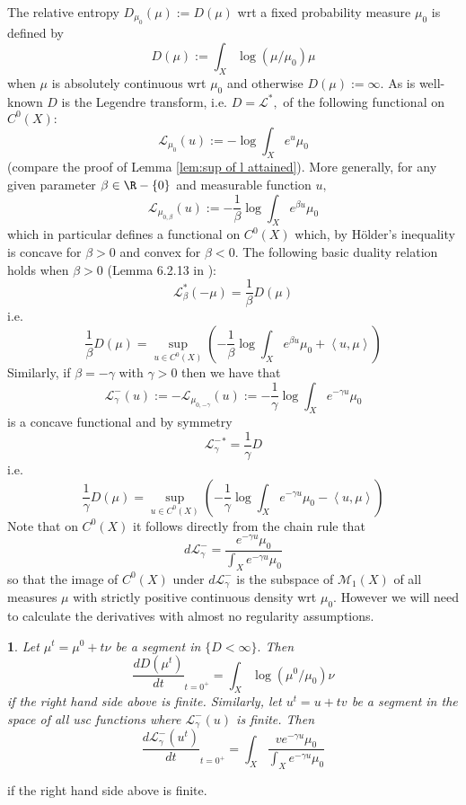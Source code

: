 \documentclass[11pt,oneside,english]{amsart}
\numberwithin{equation}{section}
\numberwithin{figure}{section}
\theoremstyle{plain}
\theoremstyle{plain}
\theoremstyle{plain}
\theoremstyle{plain}
\newtheorem{prop}[thm]{\protect\propositionname}
\theoremstyle{remark}
\theoremstyle{definition}
\providecommand{\propositionname}{Proposition}
\begin{document}
The relative entropy $D_{\mu_{0}}(\mu):=D(\mu)$ wrt a fixed probability
measure $\mu_{0}$ is defined by 
\[
D(\mu):=\int_{X}\log(\mu/\mu_{0})\mu
\]
 when $\mu$ is absolutely continuous wrt $\mu_{0}$ and otherwise
$D(\mu):=\infty.$ As is well-known $D$ is the Legendre transform,
i.e. $D=\mathcal{L}^{*},$ of the following functional on $C^{0}(X):$
\[
\mathcal{L}_{\mu_{0}}(u):=-\log\int_{X}e^{u}\mu_{0}
\]
 (compare the proof of Lemma \ref{lem:sup of l attained}). More generally,
for any given parameter $\beta\in\R-\{0\}$ and measurable function
$u,$ 
\[
\mathcal{L}_{\mu_{0,\beta}}(u):=-\frac{1}{\beta}\log\int_{X}e^{\beta u}\mu_{0}
\]
 which in particular defines a functional on $C^{0}(X)$ which, by
Hölder's inequality is concave for $\beta>0$ and convex for $\beta<0.$
The following basic duality relation holds when $\beta>0$ (Lemma
6.2.13 in \cite{de-ze}): 
\[
\mathcal{L}_{\beta}^{*}(-\mu)=\frac{1}{\beta}D(\mu)
\]
 i.e. 
\[
\frac{1}{\beta}D(\mu)=\sup_{u\in C^{0}(X)}\left(-\frac{1}{\beta}\log\int_{X}e^{\beta u}\mu_{0}+\left\langle u,\mu\right\rangle \right)
\]
 Similarly, if $\beta=-\gamma$ with $\gamma>0$ then we have that
\[
\mathcal{L}_{\gamma}^{-}(u):=-\mathcal{L}_{\mu_{0,-\gamma}}(u):=-\frac{1}{\gamma}\log\int_{X}e^{-\gamma u}\mu_{0}
\]
 is a concave functional and by symmetry 
\[
\mathcal{L}_{\gamma}^{-}{}^{*}=\frac{1}{\gamma}D
\]
 i.e. 
\[
\frac{1}{\gamma}D(\mu)=\sup_{u\in C^{0}(X)}\left(-\frac{1}{\gamma}\log\int_{X}e^{-\gamma u}\mu_{0}-\left\langle u,\mu\right\rangle \right)
\]
 Note that on $C^{0}(X)$ it follows directly from the chain rule
that 
\[
d\mathcal{L}_{\gamma}^{-}=\frac{e^{-\gamma u}\mu_{0}}{\int_{X}e^{-\gamma u}\mu_{0}}
\]
 so that the image of $C^{0}(X)$ under $d\mathcal{L}_{\gamma}^{-}$
is the subspace of $\mathcal{M}_{1}(X)$ of all measures $\mu$ with
strictly positive continuous density wrt $\mu_{0}.$ However we will
need to calculate the derivatives with almost no regularity assumptions. 
\begin{prop}
\label{pro:deriv of D}Let $\mu^{t}=\mu^{0}+t\nu$ be a segment in
$\{D<\infty\}.$ Then
\[
\frac{dD(\mu^{t})}{dt}_{t=0^{+}}=\int_{X}\log(\mu^{0}/\mu_{0})\nu
\]
 if the right hand side above is finite. Similarly, let $u^{t}=u+tv$
be a segment in the space of all usc functions where $\mathcal{L}_{\gamma}^{-}(u)$
is finite. Then 
\[
\frac{d\mathcal{L}_{\gamma}^{-}(u^{t})}{dt}_{t=0^{+}}=\int_{X}\frac{ve^{-\gamma u}\mu_{0}}{\int_{X}e^{-\gamma u}\mu_{0}}
\]

\end{prop}
if the right hand side above is finite. 
\end{document}
